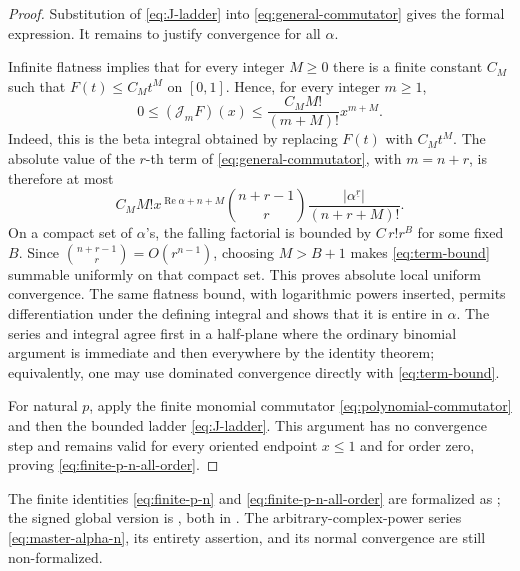 \documentclass[11pt,oneside]{article}
\theoremstyle{definition}
\theoremstyle{remark}
\newcommand{\fall}[2]{#1^{\underline{#2}}}
\newcommand{\Jn}{\mathcal J}
\newcommand{\1}{\mathbf 1}
\DeclareMathOperator{\Rea}{Re}
\begin{document}
\begin{proof}
Substitution of \eqref{eq:J-ladder} into
\eqref{eq:general-commutator} gives the formal expression.  It remains to
justify convergence for all \(\alpha\).

Infinite flatness implies that for every integer \(M\geq0\) there is a finite
constant \(C_M\) such that \(F(t)\leq C_Mt^M\) on \([0,1]\).  Hence, for every
integer \(m\geq1\),
\begin{equation}
 0\leq(\Jn_mF)(x)
 \leq \frac{C_MM!}{(m+M)!}x^{m+M}.                             \label{eq:J-flat-bound}
\end{equation}
Indeed, this is the beta integral obtained by replacing \(F(t)\) with
\(C_Mt^M\).  The absolute value of the \(r\)-th term of
\eqref{eq:general-commutator}, with \(m=n+r\), is therefore at most
\begin{equation}
 C_MM!x^{\Rea\alpha+n+M}
 \binom{n+r-1}{r}\frac{|\fall{\alpha}{r}|}{(n+r+M)!}.           \label{eq:term-bound}
\end{equation}
On a compact set of \(\alpha\)'s, the falling factorial is bounded by
\(C\,r!r^B\) for some fixed \(B\).  Since
\(\binom{n+r-1}{r}=O(r^{n-1})\), choosing \(M>B+1\) makes
\eqref{eq:term-bound} summable uniformly on that compact set.  This proves
absolute local uniform convergence.  The same flatness bound, with logarithmic
powers inserted, permits differentiation under the defining integral and
shows that it is entire in \(\alpha\).  The series and integral agree first in
a half-plane where the ordinary binomial argument is immediate and then
everywhere by the identity theorem; equivalently, one may use dominated
convergence directly with \eqref{eq:term-bound}.

For natural \(p\), apply the finite monomial commutator
\eqref{eq:polynomial-commutator} and then the bounded ladder
\eqref{eq:J-ladder}.  This argument has no convergence step and remains valid
for every oriented endpoint \(x\leq1\) and for order zero, proving
\eqref{eq:finite-p-n-all-order}.
\end{proof}

\begin{statusbox}
The finite identities \eqref{eq:finite-p-n} and
\eqref{eq:finite-p-n-all-order} are formalized as
; the signed global
version is , both in
.  The arbitrary-complex-power
series \eqref{eq:master-alpha-n}, its entirety assertion, and its normal
convergence are still non-formalized.
\end{statusbox}
\end{document}

